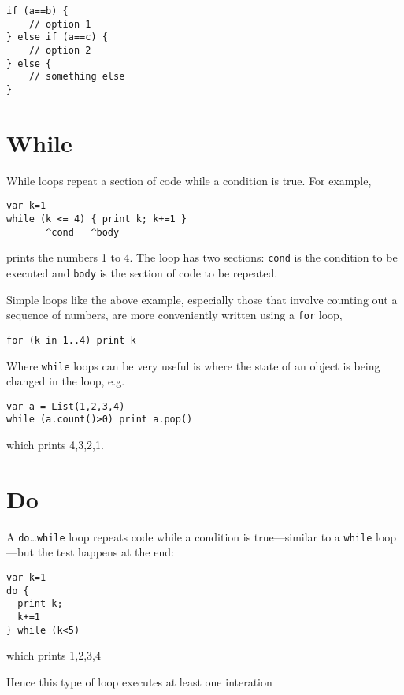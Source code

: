 \begin{lstlisting}
if (a==b) {
    // option 1
} else if (a==c) {
    // option 2
} else {
    // something else
}
\end{lstlisting}

\hypertarget{while}{%
\section{While}\label{while}}

While loops repeat a section of code while a condition is true. For
example,

\begin{lstlisting}
var k=1
while (k <= 4) { print k; k+=1 }
       ^cond   ^body
\end{lstlisting}

prints the numbers 1 to 4. The loop has two sections: \texttt{cond} is
the condition to be executed and \texttt{body} is the section of code to
be repeated.

Simple loops like the above example, especially those that involve
counting out a sequence of numbers, are more conveniently written using
a \texttt{for} loop,

\begin{lstlisting}
for (k in 1..4) print k
\end{lstlisting}

Where \texttt{while} loops can be very useful is where the state of an
object is being changed in the loop, e.g.

\begin{lstlisting}
var a = List(1,2,3,4)
while (a.count()>0) print a.pop()
\end{lstlisting}

which prints 4,3,2,1.

\hypertarget{do}{%
\section{Do}\label{do}}

A \texttt{do}\ldots{}\texttt{while} loop repeats code while a condition
is true---similar to a \texttt{while} loop---but the test happens at the
end:

\begin{lstlisting}
var k=1
do {
  print k;
  k+=1
} while (k<5)
\end{lstlisting}

which prints 1,2,3,4

Hence this type of loop executes at least one interation

